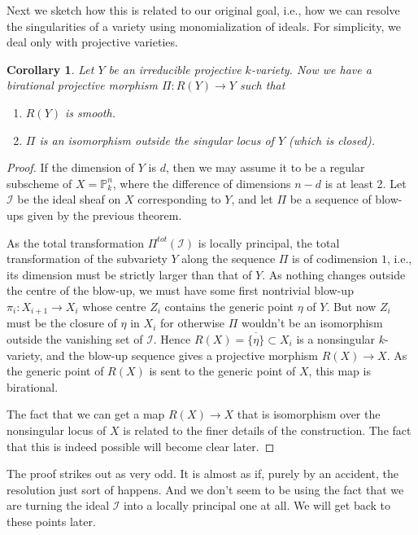 \documentclass[12pt,a4paper,leqno]{article}
\newcommand{\Proj}{\mathbb{P}}
\theoremstyle{plain}
\newtheorem{cor}[theo]{Corollary}
\theoremstyle{definition}
\theoremstyle{remark}
\begin{document}
Next we sketch how this is related to our original goal, i.e., how we can resolve the singularities of a variety using monomialization of ideals. For simplicity, we deal only with projective varieties.

\begin{cor}
Let $Y$ be an irreducible projective $k$-variety. Now we have a birational projective morphism $\Pi: R(Y) \to Y$ such that
\begin{enumerate}
\item $R(Y)$ is smooth.
\item $\Pi$ is an isomorphism outside the singular locus of $Y$ (which is closed).
\end{enumerate}
\end{cor}  
\begin{proof}
If the dimension of $Y$ is $d$, then we may assume it to be a regular subscheme of $X = \Proj^n_k$, where the difference of dimensions $n-d$ is at least 2. Let $\mathscr{I}$ be the ideal sheaf on $X$ corresponding to $Y$, and let $\Pi$ be a sequence of blow-ups given by the previous theorem. 

As the total transformation $\Pi^{tot} (\mathscr{I})$ is locally principal, the total transformation of the subvariety $Y$ along the sequence $\Pi$ is of codimension $1$, i.e., its dimension must be strictly larger than that of $Y$. As nothing changes outside the centre of the blow-up, we must have some first nontrivial blow-up $\pi_i: X_{i+1} \to X_i$ whose centre $Z_i$ contains the generic point $\eta$ of $Y$. But now $Z_i$ must be the closure of $\eta$ in $X_i$ for otherwise $\Pi$ wouldn't be an isomorphism outside the vanishing set of $\mathscr{I}$. Hence $R(X) = \overline{\{ \eta \}} \subset X_i$ is a nonsingular $k$-variety, and the blow-up sequence gives a projective morphism $R(X) \to X$. As the generic point of $R(X)$ is sent to the generic point of $X$, this map is birational.

The fact that we can get a map $R(X) \to X$ that is isomorphism over the nonsingular locus of $X$ is related to the finer details of the construction. The fact that this is indeed possible will become clear later.
\end{proof}

The proof strikes out as very odd. It is almost as if, purely by an accident, the resolution just sort of happens. And we don't seem to be using the fact that we are turning the ideal $\mathscr{I}$ into a locally principal one at all. We will get back to these points later.
 
\end{document}
